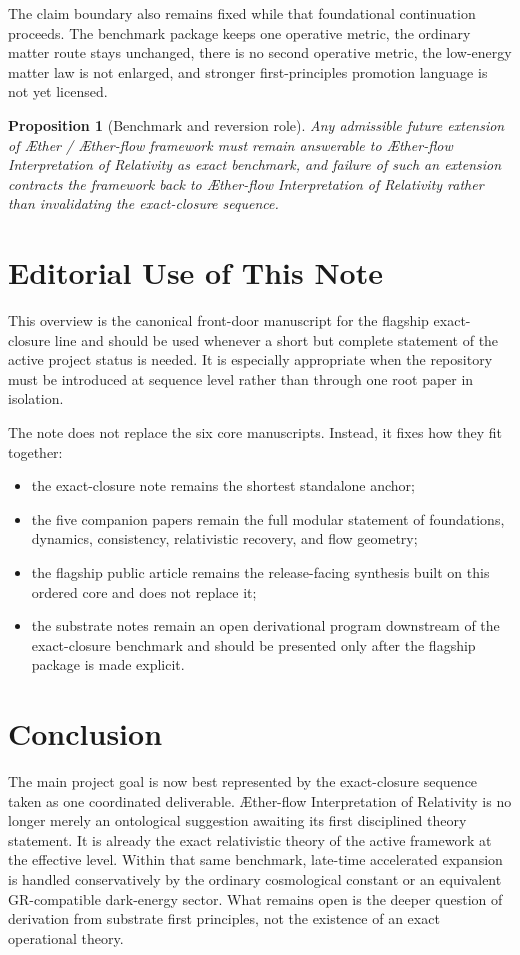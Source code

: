 \documentclass[11pt]{article}
\newcommand{\Aether}{\AE{}ther}
\newcommand{\Aflow}{\AE{}ther-flow}
\newcommand{\TheoryName}{\Aflow{} Interpretation of Relativity}
\newcommand{\TheoryProgram}{\Aether{} / \Aflow{} framework}
\newtheorem{proposition}{Proposition}
\begin{document}
The claim boundary also remains fixed while that foundational continuation proceeds. The benchmark package keeps one operative metric, the ordinary matter route stays unchanged, there is no second operative metric, the low-energy matter law is not enlarged, and stronger first-principles promotion language is not yet licensed.

\begin{proposition}[Benchmark and reversion role]
Any admissible future extension of \TheoryProgram{} must remain answerable to \TheoryName{} as exact benchmark, and failure of such an extension contracts the framework back to \TheoryName{} rather than invalidating the exact-closure sequence.
\end{proposition}

\section{Editorial Use of This Note}

This overview is the canonical front-door manuscript for the flagship exact-closure line and should be used whenever a short but complete statement of the active project status is needed. It is especially appropriate when the repository must be introduced at sequence level rather than through one root paper in isolation.

The note does not replace the six core manuscripts. Instead, it fixes how they fit together:
\begin{itemize}
    \item the exact-closure note remains the shortest standalone anchor;
    \item the five companion papers remain the full modular statement of foundations, dynamics, consistency, relativistic recovery, and flow geometry;
    \item the flagship public article remains the release-facing synthesis built on this ordered core and does not replace it;
    \item the substrate notes remain an open derivational program downstream of the exact-closure benchmark and should be presented only after the flagship package is made explicit.
\end{itemize}

\section{Conclusion}

The main project goal is now best represented by the exact-closure sequence taken as one coordinated deliverable. \TheoryName{} is no longer merely an ontological suggestion awaiting its first disciplined theory statement. It is already the exact relativistic theory of the active framework at the effective level. Within that same benchmark, late-time accelerated expansion is handled conservatively by the ordinary cosmological constant or an equivalent GR-compatible dark-energy sector. What remains open is the deeper question of derivation from substrate first principles, not the existence of an exact operational theory.
\end{document}
